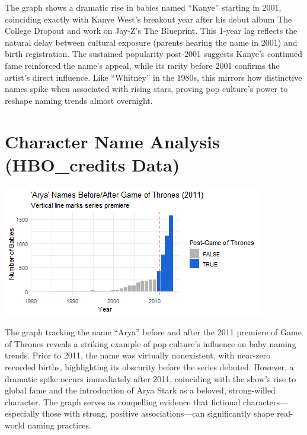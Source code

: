 \documentclass[11pt,preprint]{elsarticle}
\let\origfigure\figure
\let\endorigfigure\endfigure
\renewenvironment{figure}[1][2] {
    \expandafter\origfigure\expandafter[H]
} {
    \endorigfigure
}
\numberwithin{equation}{section}
\numberwithin{figure}{section}
\numberwithin{table}{section}
\begin{document}
The graph shows a dramatic rise in babies named ``Kanye'' starting in
2001, coinciding exactly with Kanye West's breakout year after his debut
album The College Dropout and work on Jay-Z's The Blueprint. This 1-year
lag reflects the natural delay between cultural exposure (parents
hearing the name in 2001) and birth registration. The sustained
popularity post-2001 suggests Kanye's continued fame reinforced the
name's appeal, while its rarity before 2001 confirms the artist's direct
influence. Like ``Whitney'' in the 1980s, this mirrors how distinctive
names spike when associated with rising stars, proving pop culture's
power to reshape naming trends almost overnight.

\section{Character Name Analysis (HBO\_credits
Data)}\label{character-name-analysis-hbo_credits-data}

\begin{figure}[H]

{\centering \includegraphics{23034103_Q1USbabynames_files/figure-latex/Figure 4a-1}

}

\caption{Caption Here \label{Figure1}}\label{fig:Figure 4a}
\end{figure}

The graph tracking the name ``Arya'' before and after the 2011 premiere
of Game of Thrones reveals a striking example of pop culture's influence
on baby naming trends. Prior to 2011, the name was virtually
nonexistent, with near-zero recorded births, highlighting its obscurity
before the series debuted. However, a dramatic spike occurs immediately
after 2011, coinciding with the show's rise to global fame and the
introduction of Arya Stark as a beloved, strong-willed character. The
graph serves as compelling evidence that fictional
characters---especially those with strong, positive associations---can
significantly shape real-world naming practices.
\end{document}
